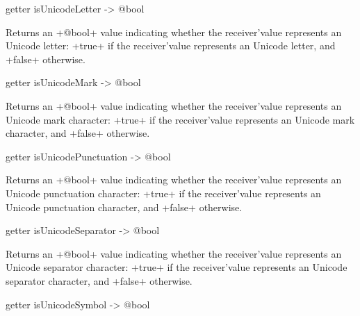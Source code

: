 
\begin{galgas3}
getter isUnicodeLetter -> @bool
\end{galgas3}

Returns an \ggst+@bool+ value indicating whether the receiver'value represents an Unicode letter: \ggst+true+ if the receiver'value represents an Unicode letter, and \ggst+false+ otherwise.







\begin{galgas3}
getter isUnicodeMark -> @bool
\end{galgas3}

Returns an \ggst+@bool+ value indicating whether the receiver'value represents an Unicode mark character: \ggst+true+ if the receiver'value represents an Unicode mark character, and \ggst+false+ otherwise.







\begin{galgas3}
getter isUnicodePunctuation -> @bool
\end{galgas3}

Returns an \ggst+@bool+ value indicating whether the receiver'value represents an Unicode punctuation character: \ggst+true+ if the receiver'value represents an Unicode punctuation character, and \ggst+false+ otherwise.







\begin{galgas3}
getter isUnicodeSeparator -> @bool
\end{galgas3}

Returns an \ggst+@bool+ value indicating whether the receiver'value represents an Unicode separator character: \ggst+true+ if the receiver'value represents an Unicode separator character, and \ggst+false+ otherwise.







\begin{galgas3}
getter isUnicodeSymbol -> @bool
\end{galgas3}


